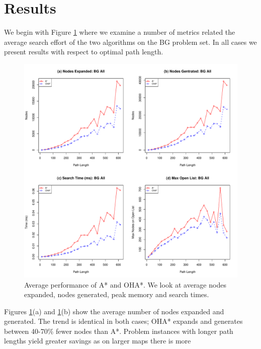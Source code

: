 \section{Results}
\label{sec-results}
We begin with Figure \ref{fig-searcheffort} where we examine a number of metrics
related the average search effort of the two algorithms on the BG problem set.
In all cases we present results with respect to optimal path length.
\begin{figure}[htbp]
	\vspace{-2pt}
	\begin{center}
		       \includegraphics[scale=0.48, trim = 20mm 17mm 20mm 5mm]{diagrams/bg_effort.pdf}
	\end{center}
	\caption{Average performance of A* and OHA*. We look at average nodes expanded, nodes generated,
	peak memory and search times.}
	\label{fig-searcheffort}
	\vspace{-12pt}
\end{figure}
\par \indent
Figures \ref{fig-searcheffort}(a) and \ref{fig-searcheffort}(b)  show the average number of 
nodes expanded and generated. 
The trend is identical in both cases; OHA* expands and generates between 40-70\% fewer nodes than A*.
Problem instances with longer path lengths yield greater savings as on larger maps there is more 

